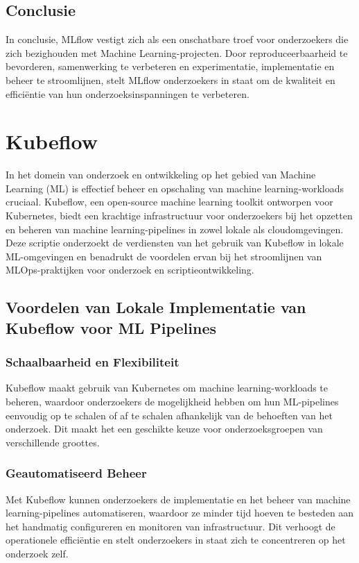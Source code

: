 \subsection{Conclusie}

In conclusie, MLflow vestigt zich als een onschatbare troef voor onderzoekers die zich bezighouden met Machine Learning-projecten. Door reproduceerbaarheid te bevorderen, samenwerking te verbeteren en experimentatie, implementatie en beheer te stroomlijnen, stelt MLflow onderzoekers in staat om de kwaliteit en efficiëntie van hun onderzoeksinspanningen te verbeteren.

\section{Kubeflow}

In het domein van onderzoek en ontwikkeling op het gebied van Machine Learning (ML) is effectief beheer en opschaling van machine learning-workloads cruciaal. Kubeflow, een open-source machine learning toolkit ontworpen voor Kubernetes, biedt een krachtige infrastructuur voor onderzoekers bij het opzetten en beheren van machine learning-pipelines in zowel lokale als cloudomgevingen. Deze scriptie onderzoekt de verdiensten van het gebruik van Kubeflow in lokale ML-omgevingen en benadrukt de voordelen ervan bij het stroomlijnen van MLOps-praktijken voor onderzoek en scriptieontwikkeling.

\subsection{Voordelen van Lokale Implementatie van Kubeflow voor ML Pipelines}

\subsubsection{Schaalbaarheid en Flexibiliteit}
Kubeflow maakt gebruik van Kubernetes om machine learning-workloads te beheren, waardoor onderzoekers de mogelijkheid hebben om hun ML-pipelines eenvoudig op te schalen of af te schalen afhankelijk van de behoeften van het onderzoek. Dit maakt het een geschikte keuze voor onderzoeksgroepen van verschillende groottes.

\subsubsection{Geautomatiseerd Beheer}
Met Kubeflow kunnen onderzoekers de implementatie en het beheer van machine learning-pipelines automatiseren, waardoor ze minder tijd hoeven te besteden aan het handmatig configureren en monitoren van infrastructuur. Dit verhoogt de operationele efficiëntie en stelt onderzoekers in staat zich te concentreren op het onderzoek zelf.

